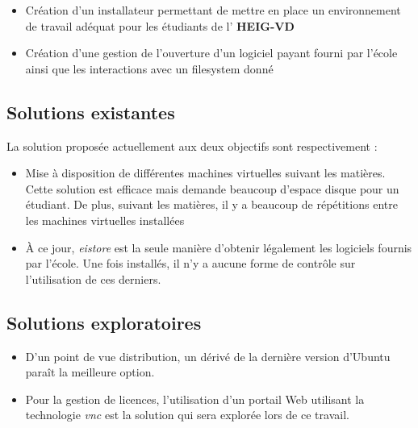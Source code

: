 \begin{itemize}
    \item Création d'un installateur permettant de mettre en place un environnement de travail adéquat pour les étudiants de l' \textbf{HEIG-VD} 
    \item Création d'une gestion de l'ouverture d'un logiciel payant fourni par l'école ainsi que les interactions avec un filesystem donné
\end{itemize}

\subsection*{Solutions existantes}
La solution proposée actuellement aux deux objectifs sont respectivement :
\begin{itemize}
    \item Mise à disposition de différentes machines virtuelles suivant les matières. 
    Cette solution est efficace mais demande beaucoup d'espace disque pour un étudiant.
    De plus, suivant les matières, il y a beaucoup de répétitions entre les machines virtuelles installées
    \item À ce jour, \textit{eistore} est la seule manière d'obtenir légalement les logiciels fournis par l'école. 
    Une fois installés, il n'y a aucune forme de contrôle sur l'utilisation de ces derniers.
\end{itemize}

\subsection*{Solutions exploratoires}
\begin{itemize}
    \item D'un point de vue distribution, un dérivé de la dernière version d'Ubuntu paraît la meilleure option.
    \item Pour la gestion de licences, l'utilisation d'un portail Web utilisant la technologie \textit{\acrfull{vnc}} est la solution qui sera explorée lors de ce travail.
\end{itemize}

